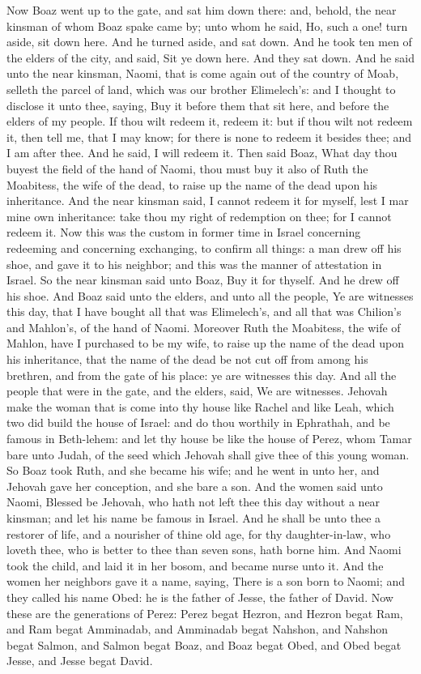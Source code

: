 Now Boaz went up to the gate, and sat him down there: and, behold, the near kinsman of whom Boaz spake came by; unto whom he said, Ho, such a one! turn aside, sit down here. And he turned aside, and sat down. And he took ten men of the elders of the city, and said, Sit ye down here. And they sat down. And he said unto the near kinsman, Naomi, that is come again out of the country of Moab, selleth the parcel of land, which was our brother Elimelech’s: and I thought to disclose it unto thee, saying, Buy it before them that sit here, and before the elders of my people. If thou wilt redeem it, redeem it: but if thou wilt not redeem it, then tell me, that I may know; for there is none to redeem it besides thee; and I am after thee. And he said, I will redeem it. Then said Boaz, What day thou buyest the field of the hand of Naomi, thou must buy it also of Ruth the Moabitess, the wife of the dead, to raise up the name of the dead upon his inheritance. And the near kinsman said, I cannot redeem it for myself, lest I mar mine own inheritance: take thou my right of redemption on thee; for I cannot redeem it.  Now this was the custom in former time in Israel concerning redeeming and concerning exchanging, to confirm all things: a man drew off his shoe, and gave it to his neighbor; and this was the manner of attestation in Israel. So the near kinsman said unto Boaz, Buy it for thyself. And he drew off his shoe. And Boaz said unto the elders, and unto all the people, Ye are witnesses this day, that I have bought all that was Elimelech’s, and all that was Chilion’s and Mahlon’s, of the hand of Naomi. Moreover Ruth the Moabitess, the wife of Mahlon, have I purchased to be my wife, to raise up the name of the dead upon his inheritance, that the name of the dead be not cut off from among his brethren, and from the gate of his place: ye are witnesses this day. And all the people that were in the gate, and the elders, said, We are witnesses. Jehovah make the woman that is come into thy house like Rachel and like Leah, which two did build the house of Israel: and do thou worthily in Ephrathah, and be famous in Beth-lehem: and let thy house be like the house of Perez, whom Tamar bare unto Judah, of the seed which Jehovah shall give thee of this young woman.  So Boaz took Ruth, and she became his wife; and he went in unto her, and Jehovah gave her conception, and she bare a son. And the women said unto Naomi, Blessed be Jehovah, who hath not left thee this day without a near kinsman; and let his name be famous in Israel. And he shall be unto thee a restorer of life, and a nourisher of thine old age, for thy daughter-in-law, who loveth thee, who is better to thee than seven sons, hath borne him. And Naomi took the child, and laid it in her bosom, and became nurse unto it. And the women her neighbors gave it a name, saying, There is a son born to Naomi; and they called his name Obed: he is the father of Jesse, the father of David.  Now these are the generations of Perez: Perez begat Hezron, and Hezron begat Ram, and Ram begat Amminadab, and Amminadab begat Nahshon, and Nahshon begat Salmon, and Salmon begat Boaz, and Boaz begat Obed, and Obed begat Jesse, and Jesse begat David. 